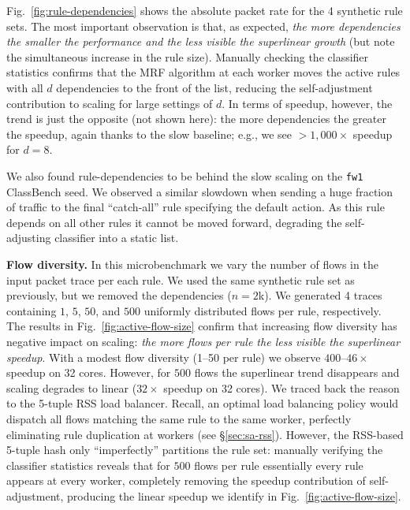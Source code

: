 Fig.~\ref{fig:rule-dependencies} shows the absolute packet rate for the 4 synthetic rule sets. The most important observation is that, as expected, \emph{the more dependencies the smaller the performance and the less visible the superlinear growth} (but note the simultaneous increase in the rule size). Manually checking the classifier statistics confirms that the MRF algorithm at each worker moves the active rules with all $d$ dependencies to the front of the list, reducing the self-adjustment contribution to scaling for large settings of $d$. In terms of speedup, however, the trend is just the opposite (not shown here): the more dependencies the greater the speedup, again thanks to the slow baseline; e.g., we see $>1,000\times$ speedup for $d=8$.

We also found rule-dependencies to be behind the slow scaling on the \texttt{fw1} ClassBench seed. We observed a similar slowdown when sending a huge fraction of traffic to the final ``catch-all'' rule specifying the default action. As this rule depends on all other rules it cannot be moved forward, degrading the self-adjusting classifier into a static list.

\noindent
\textbf{Flow diversity.} %
In this microbenchmark we vary the number of flows in the input packet trace per each rule. We used the same synthetic rule set as previously, but we removed the dependencies ($n=2$k). We generated 4 traces containing $1$, $5$, $50$, and $500$ uniformly distributed flows per rule, respectively. The results in Fig.~\ref{fig:active-flow-size} confirm that increasing flow diversity has negative impact on scaling: \emph{the more flows per rule the less visible the superlinear speedup}. With a modest flow diversity (1--50 per rule) we observe $400$--$46\times$ speedup on 32 cores. However, for $500$ flows the superlinear trend disappears and scaling degrades to linear ($32\times$ speedup on 32 cores).  We traced back the reason to the 5-tuple RSS load balancer. Recall, an optimal load balancing policy would dispatch all flows matching the same rule to the same worker, perfectly eliminating rule duplication at workers (see \S\ref{sec:sa-rss}). However, the RSS-based 5-tuple hash only ``imperfectly'' partitions the rule set: manually verifying the classifier statistics reveals that for $500$ flows per rule essentially every rule appears at every worker, completely removing the speedup contribution of self-adjustment, producing the linear speedup we identify in Fig.~\ref{fig:active-flow-size}.

